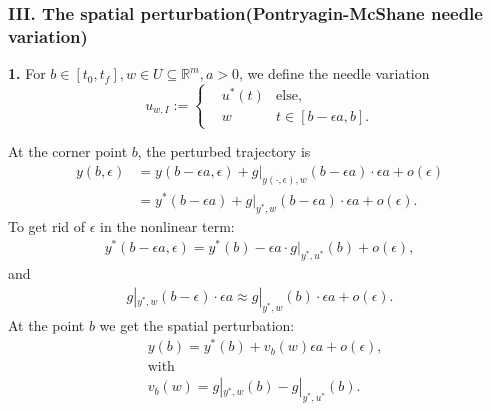 \documentclass[a4paper,11pt,fleqn]{book}
\theoremstyle{definition}
\theoremstyle{remark}
\begin{document}
\subsubsection{III. The spatial perturbation(Pontryagin-McShane needle variation)}
\textbf{1. }For $b \in [t_0, t_f], w \in U \subseteq \mathbb{R}^m, a >0$, we define the needle variation
\begin{equation}
u_{w, I}:= \left\{
\begin{aligned}
&u^*(t) & \text{else},\\
&w	& t \in [b - \epsilon a , b].
\end{aligned}
\right.
\end{equation}

At the corner point $b$, the perturbed trajectory is 
\begin{align*}
	y(b, \epsilon) &= y(b - \epsilon a, \epsilon) + g|_{y(\cdot, \epsilon) , w}(b - \epsilon a) \cdot \epsilon a + o(\epsilon)\\
	& = y^*(b - \epsilon a) + g|_{y^*, w} (b - \epsilon a) \cdot \epsilon a + o(\epsilon).
\end{align*}
To get rid of $\epsilon$ in the nonlinear term:
\begin{align*}
	y^*(b - \epsilon a, \epsilon) = y^*(b) - \epsilon a \cdot g|_{y^*, u^*}(b) + o(\epsilon),
\end{align*}
and
\begin{align*}
	g|_{y^*, w}(b - \epsilon) \cdot \epsilon a \approx g|_{y^*, w}(b) \cdot \epsilon a + o(\epsilon). 
\end{align*}
At the point $b$ we get the spatial perturbation:
\begin{equation}\label{needle variation 1}
\begin{aligned}
	& y(b) = y^*(b) + v_b(w) \epsilon a + o(\epsilon), \\
	& \text{with}\\
	& v_b(w) = g|_{y^*, w}(b) - g|_{y^*, u^*}(b). 
\end{aligned}
\end{equation}
\end{document}
